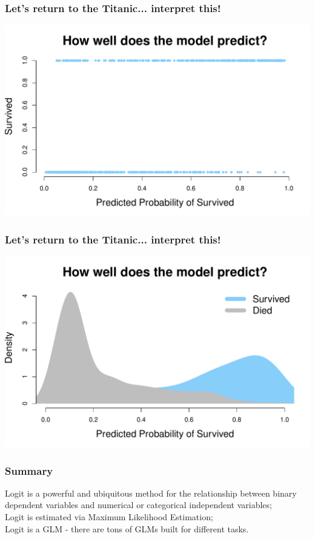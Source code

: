 \documentclass[aspectratio=169]{beamer}
\begin{document}
\begin{frame}
\frametitle{Let's return to the Titanic... interpret this!}

\begin{center}
\includegraphics[scale=0.55]{titanic_prediction_data.pdf}
\end{center}

\end{frame}

\begin{frame}
\frametitle{Let's return to the Titanic... interpret this!}

\begin{center}
\includegraphics[scale=0.55]{titanic_prediction_dens.pdf}
\end{center}

\end{frame}

\begin{frame}
\frametitle{Summary}

Logit is a powerful and ubiquitous method for the relationship between binary dependent variables and numerical or categorical independent variables;\\
\bigskip
\bigskip
Logit is estimated via Maximum Likelihood Estimation;\\
\bigskip
\bigskip
Logit is a GLM - there are tons of GLMs built for different tasks.

\end{frame}
\end{document}
